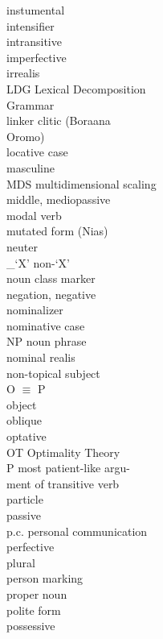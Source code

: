 \begin{multicols}{2}
\begin{tabbing}
\instr{} \> instumental\\
\intens{} \> intensifier\\
\intr{} \> intransitive\\
\ipfv{} \> imperfective\\
\irr{} \> irrealis\\
LDG \> Lexical Decomposition\\
\> Grammar\\
\lin{} \> linker clitic (Boraana\\ \> Oromo)\\
\loc{} \> locative case\\
\mas{} \> masculine\\
MDS \> multidimensional scaling\\
\Mid{} \> middle, mediopassive\\
\modal{} \> modal verb\\
\mut{} \> mutated form (Nias)\\
\neu{} \> neuter\\
\Non{}\_`X' \> non-`X'\\
\NC{} \> noun class marker\\
\Neg{} \> negation, negative\\
\nmlz{} \> nominalizer\\
\nom \> nominative case\\
NP \> noun phrase\\
\NR{} \> nominal realis\\
\nts{} \> non-topical subject\\
O \> $\equiv$ P\\
\obj{} \> object\\
\obl{} \> oblique\\
\opt{} \> optative\\
OT \> Optimality Theory\\
P \> most patient-like argu- \\ \>  ment of transitive verb \\
\partic{} \> particle\\
\pass{} \> passive\\
p.c. \> personal communication\\
\pfv{} \> perfective\\
\pl{} \> plural \\
\persm{} \> person marking\\
\propnoun{} \> proper noun\\
\polite{} \> polite form\\
\poss{} \> possessive\\

\end{tabbing}
\end{multicols}
